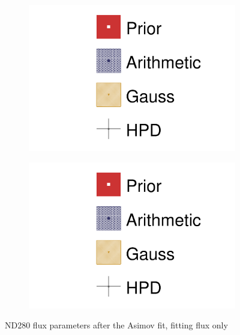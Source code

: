 \begin{figure}[h]
\begin{subfigure}[t]{0.24\textwidth}
		\includegraphics[width=\textwidth, trim={0mm 0mm 0mm 0mm}, clip,page=8]{figures/mach3/Asimov/2017b_Asimov_July2017_FixND280_FixXsec_0_drawPar}
	\end{subfigure}
	\begin{subfigure}[t]{0.24\textwidth}
		\includegraphics[width=\textwidth, trim={0mm 0mm 0mm 0mm}, clip,page=9]{figures/mach3/Asimov/2017b_Asimov_July2017_FixND280_FixXsec_0_drawPar}
	\end{subfigure}
	
	\caption{ND280 flux parameters after the Asimov fit, fitting flux only}
	\label{fig:flux_asimov_nd280_fluxonly}
\end{figure}

